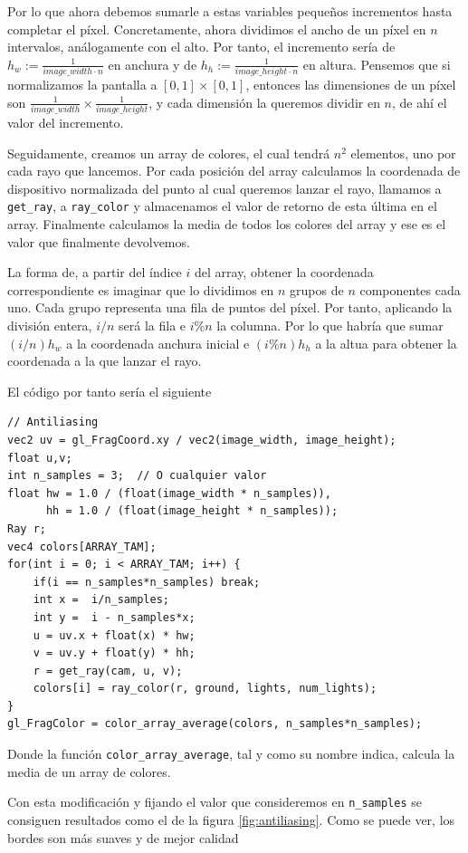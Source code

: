 Por lo que ahora debemos sumarle a estas variables pequeños incrementos hasta completar el píxel. Concretamente, ahora dividimos el ancho de un píxel en $n$ intervalos, análogamente con el alto. Por tanto, el incremento sería de $h_w:=\frac{1}{image\_width\cdot n}$ en anchura y de $h_h:=\frac{1}{image\_height\cdot n}$ en altura. Pensemos que si normalizamos la pantalla a $[0,1]\times[0,1]$, entonces las dimensiones de un píxel son $\frac{1}{image\_width}\times\frac{1}{image\_height}$, y cada dimensión la queremos dividir en $n$, de ahí el valor del incremento.

Seguidamente, creamos un array de colores, el cual tendrá $n^2$ elementos, uno por cada rayo que lancemos. Por cada posición del array calculamos la coordenada de dispositivo normalizada del punto al cual queremos lanzar el rayo, llamamos a \verb|get_ray|, a \verb|ray_color| y almacenamos el valor de retorno de esta última en el array. Finalmente calculamos la media de todos los colores del array y ese es el valor que finalmente devolvemos. 

La forma de, a partir del índice $i$ del array, obtener la coordenada correspondiente es imaginar que lo dividimos en $n$ grupos de $n$ componentes cada uno. Cada grupo representa una fila de puntos del píxel. Por tanto, aplicando la división entera, $i/n$ será la fila e $i\%n$ la columna. Por lo que habría que sumar $(i/n)h_w$ a la coordenada anchura inicial e $(i\%n)h_h$ a la altua para obtener la coordenada a la que lanzar el rayo.

El código por tanto sería el siguiente

\begin{lstlisting}
// Antiliasing
vec2 uv = gl_FragCoord.xy / vec2(image_width, image_height);
float u,v;
int n_samples = 3;  // O cualquier valor
float hw = 1.0 / (float(image_width * n_samples)),
      hh = 1.0 / (float(image_height * n_samples));
Ray r;
vec4 colors[ARRAY_TAM]; 
for(int i = 0; i < ARRAY_TAM; i++) {
    if(i == n_samples*n_samples) break;
    int x =  i/n_samples;
    int y =  i - n_samples*x;
    u = uv.x + float(x) * hw;
    v = uv.y + float(y) * hh;
    r = get_ray(cam, u, v);
    colors[i] = ray_color(r, ground, lights, num_lights);
}
gl_FragColor = color_array_average(colors, n_samples*n_samples);
\end{lstlisting}
Donde la función \verb|color_array_average|, tal y como su nombre indica, calcula la media de un array de colores.

Con esta modificación y fijando el valor que consideremos en \verb|n_samples| se consiguen resultados como el de la figura \ref{fig:antiliasing}. Como se puede ver, los bordes son más suaves y de mejor calidad

